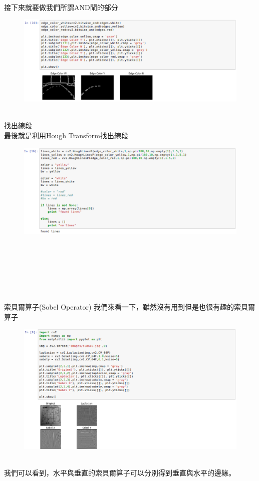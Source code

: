 \documentclass{article}
\begin{document}
\\接下來就要做我們所謂AND閘的部分
\begin{figure}[htp]
    \begin{center}
        \includegraphics[width=350pt]{pic/3_2_16.png}
    \end{center}
\end{figure}
\\
找出線段
\\最後就是利用Hough Transform找出線段
\begin{figure}[htp]
    \begin{center}
        \includegraphics[width=400pt]{pic/3_2_17.png}
    \end{center}
\end{figure}
\\
\\\\\\\\\\索貝爾算子(Sobel Operator)
我們來看一下，雖然沒有用到但是也很有趣的索貝爾算子
\begin{figure}[htp]
    \begin{center}
        \includegraphics[width=400pt]{pic/3_2_18.png}
    \end{center}
\end{figure}
\\
我們可以看到，水平與垂直的索貝爾算子可以分別得到垂直與水平的邊緣。
\end{document}
